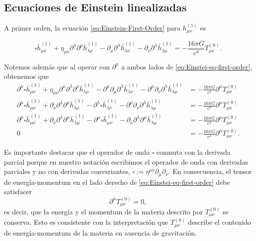 \documentclass[letterpaper,11pt]{article}
\begin{document}
\subsection*{Ecuaciones de Einstein linealizadas}

A primer orden, la ecuación \eqref{eq:Einstein-First-Order} para $h^{(1)}_{\mu\nu}$ es
\begin{shaded}
\begin{equation}
\square \bar{h}_{\mu\nu}^{(1)} + \eta_{\mu\nu} \partial^{\lambda}\partial^{\rho}\bar{h}_{\lambda\rho}^{(1)}- \partial_{\mu}\partial^{\lambda} \bar{h}_{\lambda \nu}^{(1)} - \partial_{\nu}\partial^{\lambda} \bar{h}_{\lambda\mu}^{(1)} = - \frac{16\pi G}{c^4} T_{\mu\nu}^{(0)}. \label{eq:Einstei-eq-first-order}
\end{equation}
\end{shaded}

Notemos además que al operar con $\partial^{\mu}$ a ambos lados de \eqref{eq:Einstei-eq-first-order}, obtenemos que 
\begin{align}
\partial^{\mu} \square \bar{h}_{\mu\nu}^{(1)} + \eta_{\mu\nu} \partial^{\mu} \partial^{\lambda}\partial^{\rho}\bar{h}_{\lambda\rho}^{(1)} - \partial^{\mu} \partial_{\mu}\partial^{\lambda} \bar{h}_{\lambda \nu}^{(1)} - \partial^{\mu} \partial_{\nu}\partial^{\lambda} \bar{h}_{\lambda\mu}^{(1)} &= - \frac{16\pi G}{c^4} \partial^{\mu} T_{\mu\nu}^{(0)} \\
\partial^{\mu}  \square \bar{h}_{\mu\nu}^{(1)} + \partial_{\nu}\partial^{\lambda}\partial^{\rho} \bar{h}_{\lambda\rho}^{(1)} - \partial^{\lambda} \square  \bar{h}^{(1)}_{\lambda \nu} - \partial^{\mu} \partial_{\nu}\partial^{\lambda} \bar{h}^{(1)}_{\lambda\mu} &= - \frac{16\pi G}{c^4} \partial^{\mu} T_{\mu\nu}^{(0)} \\
\partial^{\mu}  \square \bar{h}_{\mu\nu}^{(1)} + \partial_{\nu}\partial^{\lambda}\partial^{\mu} \bar{h}_{\lambda\mu}^{(1)} - \partial^{\mu} \square  \bar{h}^{(1)}_{\mu \nu} - \partial_{\nu}\partial^{\lambda} \partial^{\mu} \bar{h}^{(1)}_{\lambda\mu} &= - \frac{16\pi G}{c^4} \partial^{\mu} T_{\mu\nu}^{(0)} \\
0 &= - \frac{16\pi G}{c^4} \partial^{\mu} T_{\mu\nu}^{(0)}.
\end{align}

Es importante destacar que el operador de onda $\square$ conmuta con la derivada parcial porque en nuestro notación escribimos el operador de onda con derivadas parciales y no con derivadas convariantes, $\square:= \eta^{\mu\nu}\partial_{\mu}\partial_{\nu}$. En consecuencia, el tensor de energía-momentum en el lado derecho de \eqref{eq:Einstei-eq-first-order} debe satisfacer
\begin{equation}
\partial^{\mu} T_{\mu\nu}^{(0)} = 0,
\end{equation}
es decir, que la energía y el momentum de la materia descrito por $T_{\mu\nu}^{(0)}$ se conserva. Esto es consistente con la interpretación que $T_{\mu\nu}^{(0)}$ describe el contenido de energía-momentum de la materia en ausencia de gravitación.
\end{document}
